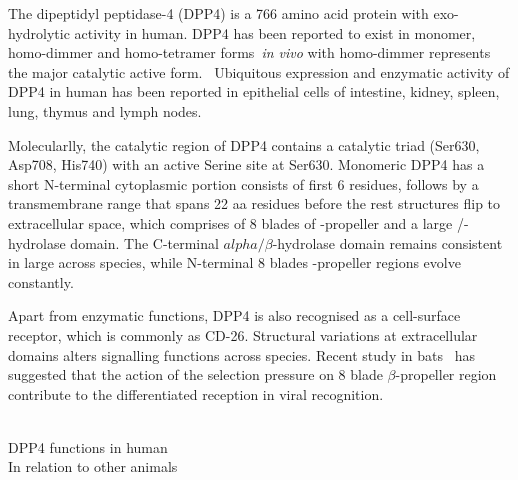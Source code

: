 The dipeptidyl peptidase-4 (DPP4) is a 766 amino acid protein with exo-hydrolytic activity in human. DPP4 has been reported to exist in  monomer, homo-dimmer and homo-tetramer forms~\textit{in vivo} with homo-dimmer represents the major catalytic active form.~\cite{Mulvihill_2014} Ubiquitous expression and enzymatic activity of DPP4 in human has been reported in epithelial cells of intestine, kidney, spleen, lung, thymus and lymph nodes. 

Molecularlly, the catalytic region of DPP4 contains a catalytic triad (Ser630, Asp708, His740) with an active Serine site at Ser630. Monomeric DPP4 has a short N-terminal cytoplasmic portion consists of first 6 residues, follows by a transmembrane range that spans 22 aa residues before the rest structures flip to extracellular space, which comprises of 8 blades of \beta-propeller and a large \alpha/\beta-hydrolase domain. The C-terminal $alpha/\beta$-hydrolase domain remains consistent in large across species, while N-terminal 8 blades \beta-propeller regions evolve constantly. 

Apart from enzymatic functions, DPP4 is also recognised as a cell-surface receptor, which is commonly as CD-26. Structural variations at extracellular domains alters signalling functions across species. Recent study in bats~\cite{Letko_2018, Cui_2013} has suggested that the action of the selection pressure on 8 blade $\beta$-propeller region contribute to the differentiated reception in viral recognition.  

\\
DPP4 functions in human 
\\ 
In relation to other animals 

